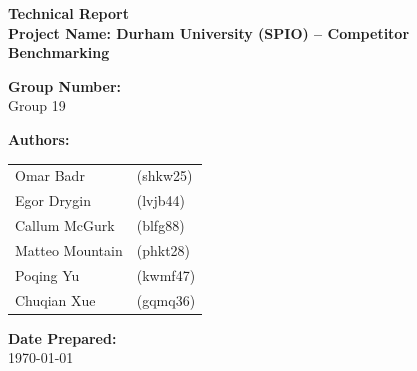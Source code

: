 \documentclass[11pt]{article} %
\begin{document}
\begin{titlepage}
    \centering
    \vspace*{2cm}
    
    \vspace{1cm}
    
    {\Huge \color{customtitles} \textbf{Technical Report}} \\
    \vspace{0.5cm}
    {\Large \textbf{Project Name: Durham University (SPIO) -- Competitor Benchmarking}} \\
    
    \vspace{2cm}
    
    \textbf{Group Number:}\\
    Group 19
    
    \vspace{1cm}
    
    \textbf{Authors:} \\
    
    \begin{tabular}{ll}
        Omar Badr & (shkw25) \\
        Egor Drygin & (lvjb44) \\
        Callum McGurk & (blfg88) \\
        Matteo Mountain & (phkt28) \\
        Poqing Yu & (kwmf47) \\
        Chuqian Xue & (gqmq36) \\
    \end{tabular}
    
    \vspace{2cm}
    
    \textbf{Date Prepared:} \\
    \today
    
    \vfill
\end{titlepage}

\tableofcontents
\newpage









\newpage




\end{document}
